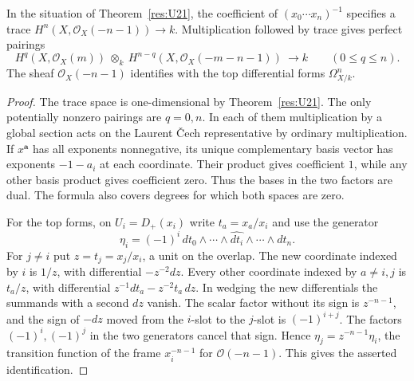 \begin{corollary}\label{res:U22}
In the situation of Theorem~\ref{res:U21}, the coefficient
of \((x_0\cdots x_n)^{-1}\) specifies a trace
\(H^n(X,\mathcal O_X(-n-1))\to k\).
Multiplication followed by trace gives perfect pairings
\[
 H^q(X,\mathcal O_X(m))\ \otimes_k\
 H^{n-q}(X,\mathcal O_X(-m-n-1))\ \longrightarrow k
 \qquad (0\leq q\leq n).
\]
The sheaf \(\mathcal O_X(-n-1)\) identifies with the
top differential forms \(\Omega^n_{X/k}\).
\end{corollary}
\begin{proof}
The trace space is one-dimensional by
Theorem~\ref{res:U21}. The only potentially nonzero
pairings are \(q=0,n\). In each of them multiplication
by a global section acts on the Laurent \v{C}ech
representative by ordinary multiplication. If \(x^{\mathbf a}\)
has all exponents nonnegative, its unique complementary
basis vector has exponents \(-1-a_i\) at each coordinate.
Their product gives coefficient \(1\), while any other
basis product gives coefficient zero. Thus the bases in
the two factors are dual. The formula also covers degrees
for which both spaces are zero.

For the top forms, on \(U_i=D_+(x_i)\) write
\(t_a=x_a/x_i\) and use the generator
\[
 \eta_i=(-1)^i\,d t_0\wedge\cdots
                   \wedge\widehat{d t_i}\wedge\cdots\wedge d t_n .
\]
For \(j\ne i\) put \(z=t_j=x_j/x_i\), a unit on the overlap.
The new coordinate indexed by \(i\) is \(1/z\), with
differential \(-z^{-2}dz\). Every other coordinate indexed
by \(a\ne i,j\) is \(t_a/z\), with differential
\(z^{-1}d t_a-z^{-2}t_a\,dz\). In wedging the new
differentials the summands with a second \(dz\) vanish.
The scalar factor without its sign is \(z^{-n-1}\), and
the sign of \(-d z\) moved from the \(i\)-slot to the \(j\)-slot
is \((-1)^{i+j}\). The factors \((-1)^i,(-1)^j\)
in the two generators cancel that sign. Hence
\(\eta_j=z^{-n-1}\eta_i\), the transition function of
the frame \(x_i^{-n-1}\) for \(\mathcal O(-n-1)\).
This gives the asserted identification.
\end{proof}
